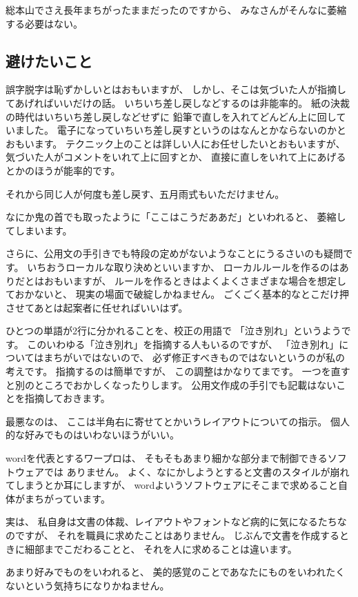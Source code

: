 \documentclass[uplatex,jis2004,dvipdfmx,12pt]{jsarticle}
\begin{document}
総本山でさえ長年まちがったままだったのですから、
みなさんがそんなに萎縮する必要はない。

\subsection{避けたいこと}
誤字脱字は恥ずかしいとはおもいますが、
しかし、そこは気づいた人が指摘してあげればいいだけの話。
いちいち差し戻しなどするのは非能率的。
紙の決裁の時代はいちいち差し戻しなどせずに
鉛筆で直しを入れてどんどん上に回していました。
電子になっていちいち差し戻すというのはなんとかならないのかとおもいます。
テクニック上のことは詳しい人にお任せしたいとおもいますが、
気づいた人がコメントをいれて上に回すとか、
直接に直しをいれて上にあげるとかのほうが能率的です。

それから同じ人が何度も差し戻す、五月雨式もいただけません。

なにか鬼の首でも取ったように「ここはこうだああだ」といわれると、
萎縮してしまいます。

さらに、公用文の手引きでも特段の定めがないようなことにうるさいのも疑問で
す。
いちおうローカルな取り決めといいますか、
ローカルルールを作るのはありだとはおもいますが、
ルールを作るときはよくよくさまざまな場合を想定しておかないと、
現実の場面で破綻しかねません。
ごくごく基本的なとこだけ押させてあとは起案者に任せればいいはず。

ひとつの単語が2行に分かれることを、校正の用語で
「泣き別れ」というようです。
このいわゆる「泣き別れ」を指摘する人もいるのですが、
「泣き別れ」についてはまちがいではないので、
必ず修正すべきものではないというのが私の考えです。
指摘するのは簡単ですが、
この調整はかなりてまです。
一つを直すと別のところでおかしくなったりします。
公用文作成の手引でも記載はないことを指摘しておきます。


最悪なのは、
ここは半角右に寄せてとかいうレイアウトについての指示。
個人的な好みでものはいわないほうがいい。


wordを代表とするワープロは、
そもそもあまり細かな部分まで制御できるソフトウェアでは
ありません。
よく、なにかしようとすると文書のスタイルが崩れてしまうとか耳にしますが、
wordよいうソフトウェアにそこまで求めること自体がまちがっています。


実は、
私自身は文書の体裁、レイアウトやフォントなど病的に気になるたちなのですが、
それを職員に求めたことはありません。
じぶんで文書を作成するときに細部までこだわることと、
それを人に求めることは違います。

あまり好みでものをいわれると、
美的感覚のことであなたにものをいわれたくないという気持ちになりかねません。
\end{document}
